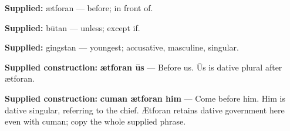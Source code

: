 \textbf{Supplied:} ætforan — before; in front of.

\textbf{Supplied:} būtan — unless; except if.

\textbf{Supplied:} gingstan — youngest; accusative, masculine, singular.

\textbf{Supplied construction:} \textbf{ætforan ūs} — Before us. Ūs is dative plural after ætforan.

\textbf{Supplied construction:} \textbf{cuman ætforan him} — Come before him. Him is dative singular, referring to the chief. Ætforan retains dative government here even with cuman; copy the whole supplied phrase.

